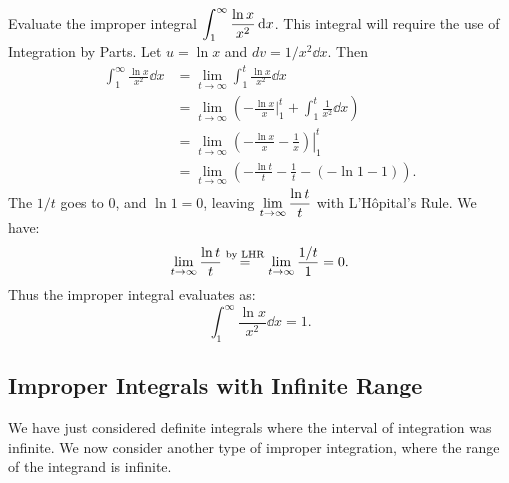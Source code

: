 \begin{example}\label{ex_impint2}%
Evaluate the improper integral $\displaystyle \int_1^\infty \frac{\ln x}{x^2}\operatorname{d}\! x$.
\solution
This integral will require the use of Integration by Parts. Let $u = \ln x$ and $dv = 1/x^2\dd x$. Then
%
%
\begin{align*}
	\int_1^\infty\frac{\ln x}{x^2}\dd x
	&= \lim_{t\to\infty}\int_1^t\frac{\ln x}{x^2}\dd x \\
	&=  \lim_{t\to\infty}\left(-\frac{\ln x}{x}\Big|_1^t +\int_1^t \frac{1}{x^2}\dd x \right)\\
	&=  \lim_{t\to\infty} \left.\left(-\frac{\ln x}{x} -\frac1x\right)\right|_1^t\\
	&=	\lim_{t\to\infty} \left(-\frac{\ln t}{t}-\frac1t - \left(-\ln 1-1\right)\right).
\end{align*}
The $1/t$ goes to 0, and $\ln 1=0$, leaving
$\displaystyle \lim_{t\to\infty} \frac{\ln t}{t}$ with L'Hôpital's Rule. We have:
\[\lim_{t\to\infty}\frac{\ln t}t \mathrel{\overset{\text{by LHR}}{=}} \lim_{t\to\infty} \frac{1/t}{1} = 0.\]
Thus the improper integral evaluates as:
\[\int_1^\infty\frac{\ln x}{x^2}\dd x = 1.\]
\end{example}

\subsection{Improper Integrals with Infinite Range}

We have just considered definite integrals where the interval of integration was infinite. We now consider another type of improper integration, where the range of the integrand is infinite.

